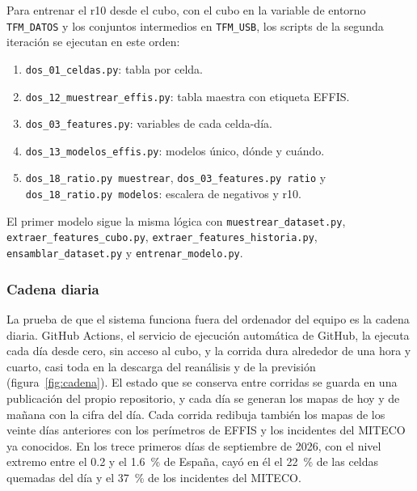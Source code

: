 \documentclass[10pt,a4paper]{article}
\begin{document}
Para entrenar el r10 desde el cubo, con el cubo en la variable de entorno
\texttt{TFM\_DATOS} y los conjuntos intermedios en \texttt{TFM\_USB}, los
scripts de la segunda iteración se ejecutan en este orden:
\begin{enumerate}[label=\arabic*., leftmargin=2em]
  \item \texttt{dos\_01\_celdas.py}: tabla por celda.
  \item \texttt{dos\_12\_muestrear\_effis.py}: tabla maestra con etiqueta EFFIS.
  \item \texttt{dos\_03\_features.py}: variables de cada celda-día.
  \item \texttt{dos\_13\_modelos\_effis.py}: modelos único, dónde y cuándo.
  \item \texttt{dos\_18\_ratio.py muestrear}, \texttt{dos\_03\_features.py ratio} y \texttt{dos\_18\_ratio.py modelos}: escalera de negativos y r10.
\end{enumerate}
El primer modelo sigue la misma lógica con \texttt{muestrear\_dataset.py},
\texttt{extraer\_features\_cubo.py}, \texttt{extraer\_features\_historia.py},
\texttt{ensamblar\_dataset.py} y \texttt{entrenar\_modelo.py}.



\subsubsection{Cadena diaria}
\label{an:b5-cadena}

La prueba de que el sistema funciona fuera del ordenador del equipo es la
cadena diaria. GitHub Actions, el servicio de ejecución automática de GitHub, la
ejecuta cada día desde cero, sin acceso al cubo, y la corrida dura alrededor de
una hora y cuarto, casi toda en la descarga del reanálisis y de la previsión
(figura~\ref{fig:cadena}). El estado que se conserva entre corridas se guarda en
una publicación del propio repositorio, y cada día se generan los mapas de hoy y
de mañana con la cifra del día. Cada corrida redibuja también los mapas de los
veinte días anteriores con los perímetros de EFFIS y los incidentes del MITECO
ya conocidos. En los trece primeros días de septiembre de 2026, con el nivel
extremo entre el 0.2 y el 1.6~\% de España, cayó en él el 22~\% de las celdas
quemadas del día y el 37~\% de los incidentes del MITECO.
\end{document}
